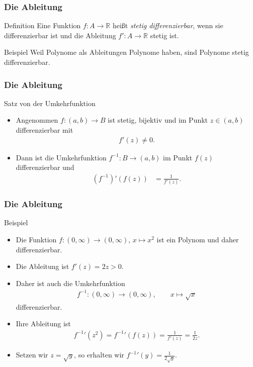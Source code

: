 \documentclass{beamer}
\renewcommand{\emph}[1]{{\textcolor{solarizedRed}{\itshape #1}}}
\newcommand\RR{\mathbb R}
\newcommand{\mytitle}{Die Ableitung}
\begin{document}
\begin{frame}\frametitle{\mytitle}
	\begin{block}{Definition}
		Eine Funktion $f:A\to\RR$ hei\ss t \emph{stetig differenzierbar}, wenn sie differenzierbar ist und die Ableitung $f':A\to\RR$ stetig ist.
	\end{block}
\begin{block}{Beispiel}
		Weil Polynome als Ableitungen Polynome haben, sind Polynome stetig differenzierbar.
	\end{block}
\end{frame}

\begin{frame}\frametitle{\mytitle}
	\begin{block}{Satz von der Umkehrfunktion}
	\begin{itemize}
		\item Angenommen $f:(a,b)\to B$ ist stetig, bijektiv und im Punkt $z\in(a,b)$ differenzierbar mit
			\begin{align*}
				f'(z)\neq0.
			\end{align*}
		\item Dann ist die Umkehrfunktion $f^{-1}:B\to(a,b)$ im Punkt $f(z)$ differenzierbar und
		\begin{align*}
			(f^{-1})'(f(z))&=\frac{1}{f'(z)}.
		\end{align*}
	\end{itemize}
	\end{block}
\end{frame}

\begin{frame}\frametitle{\mytitle}
	\begin{block}{Beispiel}
	\begin{itemize}
		\item Die Funktion $f:(0,\infty)\to(0,\infty)$, $x\mapsto x^2$ ist ein Polynom und daher differenzierbar.
		\item Die Ableitung ist $f'(z)=2z>0$.
		\item Daher ist auch die Umkehrfunktion
			\begin{align*}
				f^{-1}:(0,\infty)\to(0,\infty),\qquad x\mapsto\sqrt x
			\end{align*}
			differenzierbar.
		\item Ihre Ableitung ist
			\begin{align*}
				{f^{-1}}'(z^2)={f^{-1}}'(f(z))=\frac{1}{f'(z)}=\frac{1}{2z}.
			\end{align*}
		\item Setzen wir $z=\sqrt y$, so erhalten wir $ {f^{-1}}'(y)=\frac{1}{2\sqrt y}.  $
	\end{itemize}
	\end{block}
\end{frame}
\end{document}
